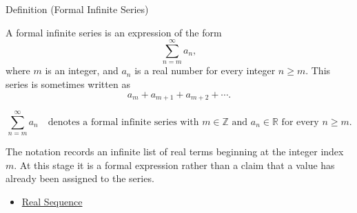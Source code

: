 \begin{definitionbox}{Definition (Formal Infinite Series)}
\begin{definition}
\label{def:formal-infinite-series}

A formal infinite series is an expression of the form
\[
  \sum_{n=m}^{\infty} a_n,
\]
where \(m\) is an integer, and \(a_n\) is a real number for every
integer \(n\ge m\). This series is sometimes written as
\[
  a_m+a_{m+1}+a_{m+2}+\cdots.
\]
\end{definition}
\end{definitionbox}

\begin{remark*}
\[
  \sum_{n=m}^{\infty} a_n
  \quad\text{denotes a formal infinite series with } m\in\mathbb{Z}
  \text{ and } a_n\in\mathbb{R}\text{ for every } n\ge m.
\]
\end{remark*}

\begin{remark*}[Interpretation]
The notation records an infinite list of real terms beginning at the
integer index \(m\). At this stage it is a formal expression rather than a
claim that a value has already been assigned to the series.
\end{remark*}

\begin{dependencies}
\begin{itemize}
  \item \hyperref[def:real-sequence]{Real Sequence}
\end{itemize}
\end{dependencies}

